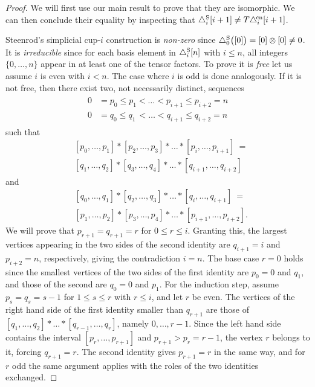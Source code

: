 \begin{proof}
	We will first use our main result to prove that they are isomorphic.
	We can then conclude their equality by inspecting that $\triangle^{\mathrm{S}}_i [i+1] \neq T \triangle^{\!\mathrm{cn}}_i [i+1]$.

	Steenrod's simplicial \mbox{cup-$i$} construction is \emph{non-zero} since $\triangle^{\mathrm{S}}_0\big([0]\big) = [0] \otimes [0] \neq 0$.
	It is \emph{irreducible} since for each basis element in $\triangle^{\mathrm{S}}_i [n]$ with $i \leq n$, all integers $\{0, \dots, n\}$ appear in at least one of the tensor factors.
	To prove it is \emph{free} let us assume $i$ is even with $i < n$.
	The case where $i$ is odd is done analogously.
	If it is not free, then there exist two, not necessarily distinct, sequences
	\begin{align*}
	\begin{split}
	0 &= p_0 \leq p_1 < \dots < p_{i+1} \leq p_{i+2} = n \\
	0 &= q_0 \leq q_1 \,< \dots < q_{i+1} \leq q_{i+2} = n
	\end{split}
	\end{align*}
	such that
	\[
	\begin{split}
	&[ {p_0}, \dots, {p_1} ] \ast [ {p_2}, \dots, {p_3} ] \ast \dots \ast [ {p_{i}}, \dots, {p_{i+1}} ]\ = \\
	&[ {q_1}, \dots, {q_2} ] \ast [ {q_3}, \dots, {q_4} ] \ast \dots \ast [ {q_{i+1}}, \dots, {q_{i+2}} ]
	\end{split}
	\]
	and
	\[
	\begin{split}
	&[ {q_0}, \dots, {q_1} ] \ast [ {q_2}, \dots, {q_3} ] \ast \dots \ast [ {q_{i}}, \dots, {q_{i+1}} ]\ = \\
	&[ {p_1}, \dots, {p_2} ] \ast [ {p_3}, \dots, {p_4} ] \ast \dots \ast [ {p_{i+1}}, \dots, {p_{i+2}} ].
	\end{split}
	\]
	We will prove that $p_{r+1} = q_{r+1} = r$ for $0 \leq r \leq i$.
	Granting this, the largest vertices appearing in the two sides of the second identity are $q_{i+1} = i$ and $p_{i+2} = n$, respectively, giving the contradiction $i = n$.
	The base case $r = 0$ holds since the smallest vertices of the two sides of the first identity are $p_0 = 0$ and $q_1$, and those of the second are $q_0 = 0$ and $p_1$.
	For the induction step, assume $p_s = q_s = s - 1$ for $1 \leq s \leq r$ with $r \leq i$, and let $r$ be even.
	The vertices of the right hand side of the first identity smaller than $q_{r+1}$ are those of $[q_1, \dots, q_2] \ast \dots \ast [q_{r-1}, \dots, q_r]$, namely $0, \dots, r-1$.
	Since the left hand side contains the interval $[p_r, \dots, p_{r+1}]$ and $p_{r+1} > p_r = r - 1$, the vertex $r$ belongs to it, forcing $q_{r+1} = r$.
	The second identity gives $p_{r+1} = r$ in the same way, and for $r$ odd the same argument applies with the roles of the two identities exchanged.


\end{proof}
